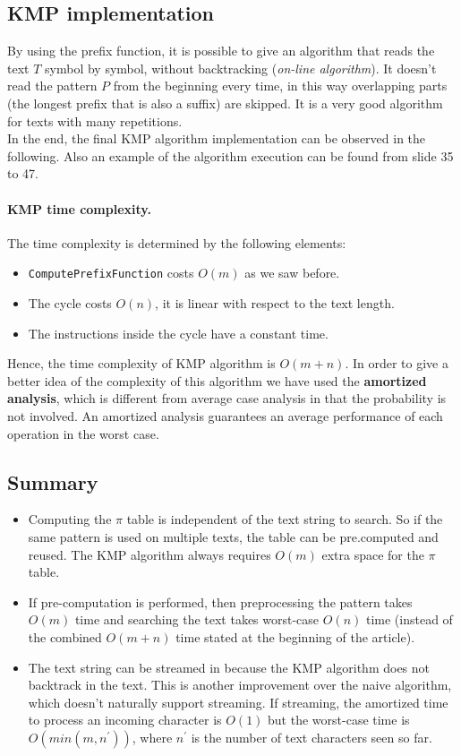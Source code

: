 \subsection{KMP implementation}
By using the prefix function, it is possible to give an algorithm that reads the text $T$ symbol by symbol, without backtracking (\textit{on-line algorithm}). It doesn't read the pattern $P$ from the beginning every time, in this way overlapping parts (the longest prefix that is also a suffix) are skipped. It is a very good algorithm for texts with many repetitions.\\
In the end, the final KMP algorithm implementation can be observed in the following. Also an example of the algorithm execution can be found from slide 35 to 47.

\paragraph*{KMP time complexity.} The time complexity is determined by the following elements:
\begin{itemize}
	\item \verb|ComputePrefixFunction| costs $O(m)$ as we saw before.
	\item The cycle costs $O(n)$, it is linear with respect to the text length.
	\item The instructions inside the cycle have a constant time.
\end{itemize}
Hence, the time complexity of KMP algorithm is $O(m+n)$. In order to give a better idea of the complexity of this algorithm we have used the \textbf{amortized analysis}, which is different from average case analysis in that the probability is not involved. An amortized analysis guarantees an average performance of each operation in the worst case.

\subsection{Summary}
\begin{itemize}
	\item Computing the $\pi$ table is independent of the text string to search. So if the same pattern is used on multiple texts, the table can be pre.computed and reused. The KMP algorithm always requires $O(m)$ extra space for the $\pi$ table.
	
	\item If pre-computation is performed, then preprocessing the pattern takes $O(m)$ time and searching the text takes worst-case $O(n)$ time (instead of the combined $O(m + n)$ time stated at the beginning of the article).
	
	\item The text string can be streamed in because the KMP algorithm does not backtrack in the text. This is another improvement over the naive algorithm, which doesn’t naturally support streaming. If streaming, the amortized time to process an incoming character is $O(1)$ but the worst-case time is $O(min(m, n^\prime))$, where $n^\prime$ is the number of text characters seen so far.	
\end{itemize}


